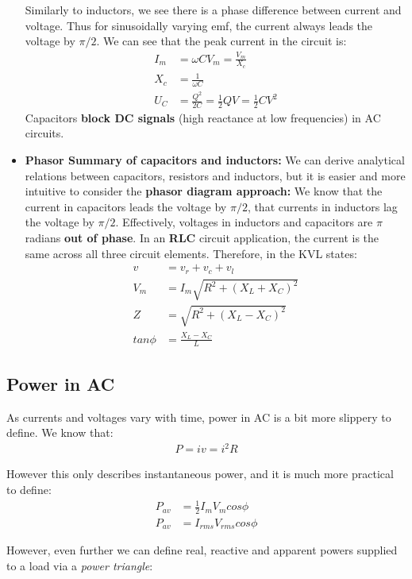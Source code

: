 \documentclass{book}
\begin{document}
\begin{itemize}
	Similarly to inductors, we see there is a phase difference between current and voltage. Thus for sinusoidally varying emf, the current always leads the voltage by $\pi/2$.  We can see that the peak current in the circuit is:
	\begin{align*}
		I_m &= \omega C V_m = \frac{V_m}{X_c} \\
		X_c &= \frac{1}{\omega C} \\
		U_C &= \frac{Q^2}{2C} = \frac{1}{2}QV = \frac{1}{2}CV^2
	\end{align*}
	Capacitors \textbf{block DC signals} (high reactance at low frequencies) in AC circuits.
	\item \textbf{Phasor Summary of capacitors and inductors:} We can derive analytical relations between capacitors, resistors and inductors, but it is easier and more intuitive to consider the \textbf{phasor diagram approach:} We know that the current in capacitors leads the voltage by $\pi/2$, that currents in inductors lag the voltage by $\pi/2$. Effectively, voltages in inductors and capacitors are $\pi$ radians \textbf{out of phase}. In an \textbf{RLC} circuit application, the current is the same across all three circuit elements. Therefore, in the KVL states:
	\begin{align*}
		v &= v_r + v_c + v_l \\
		V_m &= I_m \sqrt{R^2 + (X_L + X_C)^2} \\
		Z &= \sqrt{R^2 + (X_L - X_C)^2} \\
		tan \phi &= \frac{X_L-X_C}{L}
	\end{align*}
\end{itemize}

\subsection{Power in AC}

As currents and voltages vary with time, power in AC is a bit more slippery to define. We know that:
\begin{align*}
	P = iv = i^2 R
\end{align*}

However this only describes instantaneous power, and it is much more practical to define:
\begin{align*}
	P_{av} &= \frac{1}{2} I_m V_m cos \phi \\
	P_{av} &= I_{rms} V_{rms} cos \phi 
\end{align*}

However, even further we can define real, reactive and apparent powers supplied to a load via a \textit{power triangle}:
\end{document}
